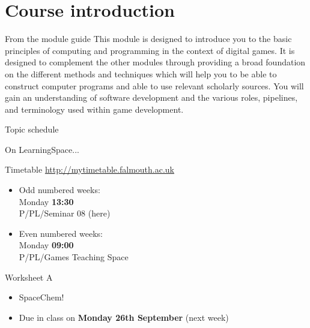 \part{Course introduction}
\frame{\partpage}

\begin{frame}{From the module guide}
This module is designed to introduce you to the basic principles of computing and programming in the context of digital games. It is designed to complement the other modules through providing a broad foundation on the different methods and techniques which will help you to be able to construct computer programs and able to use relevant scholarly sources. You will gain an understanding of software development and the various roles, pipelines, and terminology used within game development.
\end{frame}

\begin{frame}{Topic schedule}
	\begin{center}
		On LearningSpace...
	\end{center}
\end{frame}

\begin{frame}{Timetable}
	\url{http://mytimetable.falmouth.ac.uk}
	\begin{itemize}
		\item Odd numbered weeks: \\ Monday \textbf{13:30} \\ P/PL/Seminar 08 (here)
		\item Even numbered weeks: \\ Monday \textbf{09:00} \\ P/PL/Games Teaching Space
	\end{itemize}
\end{frame}

\begin{frame}{Worksheet A}
	\begin{itemize}
		\item SpaceChem!
		\item Due in class on \textbf{Monday 26th September} (next week)
	\end{itemize}
\end{frame}
